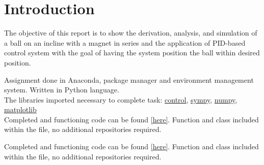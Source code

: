 
\section{Introduction}%
\label{Introduction}
The objective of this report is to show the derivation, analysis, and simulation of a ball on an incline with a magnet in series and the application of PID-based control system with the goal of having the system position the ball within desired position.

Assignment done in Anaconda, package manager and environment management system. Written in Python language.\\ The libraries imported necessary to complete task: \href{https://anaconda.org/conda-forge/control}{control}, \href{https://anaconda.org/anaconda/sympy}{sympy}, \href{https://anaconda.org/anaconda/numpy}{numpy}, \href{https://anaconda.org/conda-forge/matplotlib}{matplotlib} \\

Completed and functioning code can be found \href{https://github.com/ELE2024-Controls/Coursework}{[here]}. Function and class included within the file, no additional repositories required.

Completed and functioning code can be found \href{https://gist.github.com/Vensim/adaf1ec6935d5480d76caf70c7c3685d}{[here]}. Function and class included within the file, no additional repositories required.